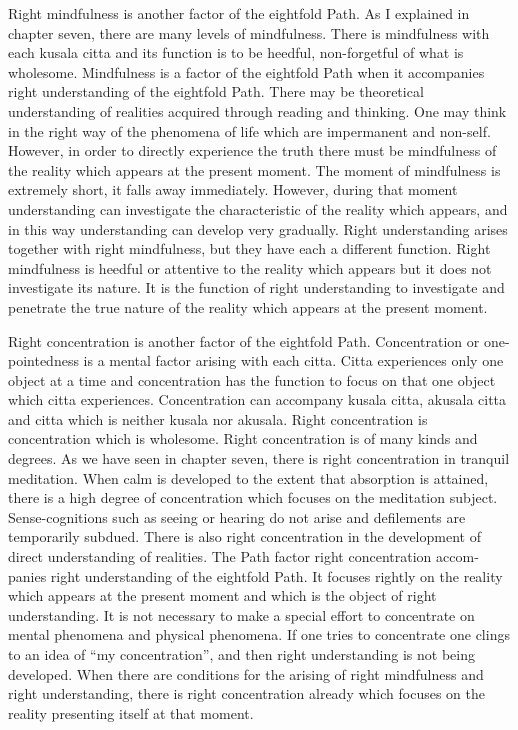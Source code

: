 \documentclass{book}
\begin{document}
Right mindfulness is another factor of the eightfold Path. As I
explained in chapter seven, there are many levels of mindfulness. There
is mindfulness with each kusala citta and its function is to be heedful,
non-forgetful of what is wholesome. Mindfulness is a factor of the
eightfold Path when it accompanies right understanding of the eightfold
Path. There may be theoretical understanding of realities acquired
through reading and thinking. One may think in the right way of the
phenomena of life which are imper­manent and non-self. However, in order
to directly expe­rience the truth there must be mindfulness of the
reality which appears at the present moment. The moment of mindfulness
is extremely short, it falls away immedi­ately. However, during that
moment understanding can invest­igate the characteristic of the reality
which appears, and in this way understanding can develop very gradually.
Right understanding arises together with right mindful­ness, but they
have each a different function. Right mindfulness is heedful or    attentive to the reality which appears but it does not investigate
its nature. It is the function of right understanding to investigate and
penetrate the true nature of the reality which appears at the present
moment.

Right concentration is another factor of the eightfold Path.
Concentration or one-pointedness is a mental factor arising with each
citta. Citta experiences only one object at a time and concentration has
the function to focus on that one object which citta experiences.
Concentration can accompany kusala citta, akusala citta and citta which
is neither kusala nor akusala. Right concentration is concentration
which is wholesome. Right concentration is of many kinds and degrees.     As we have seen in chapter seven, there is right concentration in 
tranquil medit­ation. When calm is developed to the extent that absorp­tion is attained, there is a high degree of concentra­tion    which focuses on the meditation subject. Sense-cognitions such as 
seeing or hearing do not arise and defilements are temporarily subdued. There is also right concentration in the development of direct understanding of realities. The Path factor right concen­tration accom­panies right understanding of the eightfold Path.
It focuses rightly on the reality which appears at the present moment
and which is the object of right understanding. It is not necessary to  make a special effort to concentrate on mental phenomena and physical
phenomena. If one tries to concen­trate one clings to an idea of
``my concentra­tion'', and then right under­standing is not being developed. When there are conditions for the arising of right
mindfulness and right understanding, there is right concentration
already which focuses on the reality presenting itself at that moment.
\end{document}
